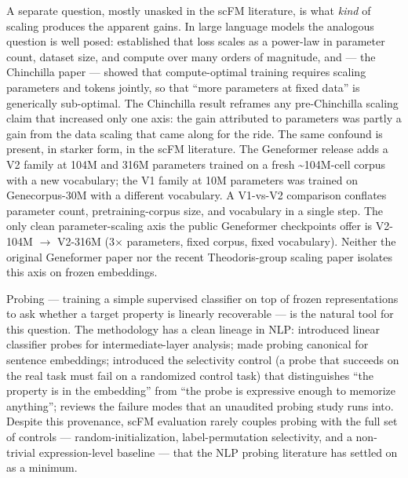 \documentclass[10pt]{article}
\begin{document}
A separate question, mostly unasked in the scFM literature, is what
\emph{kind} of scaling produces the apparent gains. In large language
models the analogous question is well posed: \citet{kaplan2020scaling}
established that loss scales as a power-law in parameter count, dataset
size, and compute over many orders of magnitude, and \citet{hoffmann2022chinchilla} --- the Chinchilla paper --- showed that compute-optimal
training requires scaling parameters and tokens jointly, so that ``more
parameters at fixed data'' is generically sub-optimal. The Chinchilla
result reframes any pre-Chinchilla scaling claim that increased only one
axis: the gain attributed to parameters was partly a gain from the data
scaling that came along for the ride. The same confound is present, in
starker form, in the scFM literature. The Geneformer release adds a V2
family at 104M and 316M parameters trained on a fresh
\textasciitilde104M-cell corpus with a new vocabulary; the V1 family at
10M parameters was trained on Genecorpus-30M with a different
vocabulary. A V1-vs-V2 comparison conflates parameter count,
pretraining-corpus size, and vocabulary in a single step. The only clean
parameter-scaling axis the public Geneformer checkpoints offer is
V2-104M $\to$ V2-316M (3$\times$ parameters, fixed corpus, fixed vocabulary).
Neither the original Geneformer paper nor the recent Theodoris-group
scaling paper \citep{venkatesh2026} isolates this axis on frozen
embeddings.

Probing --- training a simple supervised classifier on top of frozen
representations to ask whether a target property is linearly recoverable
--- is the natural tool for this question. The methodology has a clean
lineage in NLP: \citet{alainbengio2016probes} introduced linear
classifier probes for intermediate-layer analysis; \citet{conneau2018}
made probing canonical for sentence embeddings; \citet{hewitt2019}
introduced the selectivity control (a probe that succeeds on the real
task must fail on a randomized control task) that distinguishes ``the
property is in the embedding'' from ``the probe is expressive enough to
memorize anything''; \citet{belinkov2022} reviews the failure modes that an
unaudited probing study runs into. Despite this provenance, scFM
evaluation rarely couples probing with the full set of controls ---
random-initialization, label-permutation selectivity, and a non-trivial
expression-level baseline --- that the NLP probing literature has
settled on as a minimum.
\end{document}
